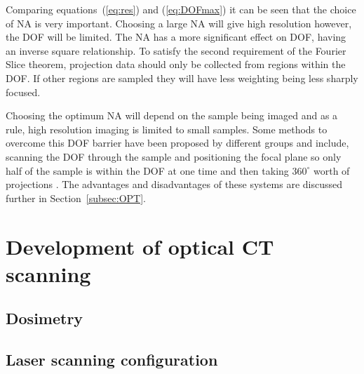 	Comparing equations~(\ref{eq:res}) and (\ref{eq:DOFmax}) it can be seen that the choice of NA is very important.  Choosing a large NA will give high resolution however, the DOF will be limited. The NA has a more significant effect on DOF, having an inverse square relationship. To satisfy the second requirement of the Fourier Slice theorem, projection data should only be collected from regions within the DOF. If other regions are sampled they will have less weighting being less sharply focused. 
	
	Choosing the optimum NA will depend on the sample being imaged and as a rule, high resolution imaging is limited to small samples. Some methods to overcome this DOF barrier have been proposed by different groups and include, scanning the DOF through the sample \cite{Fauver:2005} and positioning the focal plane so only half of the sample is within  the DOF at one time and then taking $360^{\circ}$ worth of projections \cite{Sharpe:2002jp}. The advantages and disadvantages of these systems are discussed further in Section~\ref{subsec:OPT}.
	
	
	
	
	
	
	
	\section{Development of optical CT scanning}
	
	\subsection{Dosimetry}
	\label{sec:dos}
	\subsection*{Laser scanning configuration}
	
